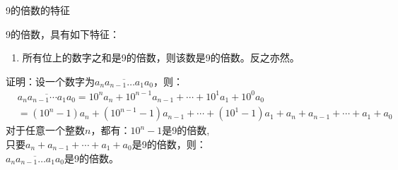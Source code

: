 \documentclass[aspectratio=169]{ctexbeamer} %
\date{\today}
\begin{document}
\begin{frame}[t]{9的倍数的特征}
\begin{spacing}{1.2}
\normalsize
9的倍数，具有如下特征：
\begin{enumerate}[label={\arabic*.}]
\item \alert{所有位上的数字之和是9的倍数，则该数是9的倍数。反之亦然。}
\end{enumerate}
证明：设一个数字为$\overline{a_{n}a_{n-1} \dots a_{1}a_{0}}$，则：
\begin{align*}
&\overline{a_{n}a_{n-1} \cdots a_{1}a_{0}} = 10^{n}a_{n} + 10^{n-1}a_{n-1} +\cdots + 10^{1}a_{1} + 10^0a_{0} \\
&=(10^{n}-1)a_{n} + (10^{n-1}-1)a_{n-1}+ \cdots + (10^{1}-1)a_{1} + a_{n} +  a_{n-1} +\cdots + a_{1} + a_{0} 
\end{align*}
对于任意一个整数$n$，都有：$10^{n}-1$是9的倍数, \\
只要$a_{n} +  a_{n-1} +\cdots + a_{1} + a_{0}$是9的倍数，则：\\
$\overline{a_{n}a_{n-1} \dots a_{1}a_{0}}$是9的倍数。
\end{spacing}
\end{frame}
\end{document}
